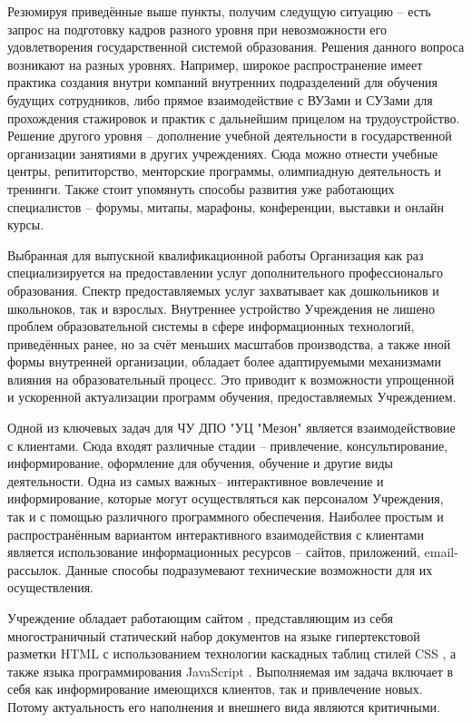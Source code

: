 Резюмируя приведённые выше пункты, получим следущую ситуацию -- есть запрос на подготовку кадров разного уровня при невозможности его удовлетворения государственной системой образования.
Решения данного вопроса возникают на разных уровнях.
Например, широкое распространение имеет практика создания внутри компаний внутренних подразделений для обучения будущих сотрудников, либо прямое взаимодействие с ВУЗами и СУЗами для прохождения стажировок и практик с дальнейшим прицелом на трудоустройство.
Решение другого уровня -- дополнение учебной деятельности в государственной организации занятиями в других учреждениях.
Сюда можно отнести учебные центры, репититорство, менторские программы, олимпиадную деятельность и тренинги.
Также стоит упомянуть способы развития уже работающих специалистов -- форумы, митапы, марафоны, конференции, выставки и онлайн курсы.

Выбранная для выпускной квалификационной работы Организация как раз специализируется на предоставлении услуг дополнительного профессиональго образования.
Спектр предоставляемых услуг захватывает как дошкольников и школьноков, так и взрослых.
Внутреннее устройство Учреждения не лишено проблем образовательной системы в сфере информационных технологий, приведённых ранее, но за счёт меньших масштабов производства, а также иной формы внутренней организации, обладает более адаптируемыми механизмами влияния на образовательный процесс.
Это приводит к возможности упрощенной и ускоренной актуализации программ обучения, предоставляемых Учреждением.

Одной из ключевых задач для ЧУ ДПО "УЦ "Мезон" является взаимодействовие с клиентами.
Сюда входят различные стадии -- привлечение, консультирование, информирование, оформление для обучения, обучение и другие виды деятельности.
Одна из самых важных-- интерактивное вовлечение и информирование, которые могут осуществляться как персоналом Учреждения, так и с помощью различного программного обеспечения.
Наиболее простым и распространённым вариантом интерактивного взаимодействия с клиентами является использование информационных ресурсов -- сайтов, приложений, email-рассылок.
Данные способы подразумевают технические возможности для их осуществления.

Учреждение обладает работающим сайтом \cite{meson-uc}, представляющим из себя многостраничный статический набор документов на языке гипертекстовой разметки HTML \cite{wiki-html} с использованием технологии каскадных таблиц стилей CSS \cite{wiki-css}, а также языка программирования JavaScript \cite{wiki-js}.
Выполняемая им задача включает в себя как информирование имеющихся клиентов, так и привлечение новых.
Потому актуальность его наполнения и внешнего вида являются критичными.

